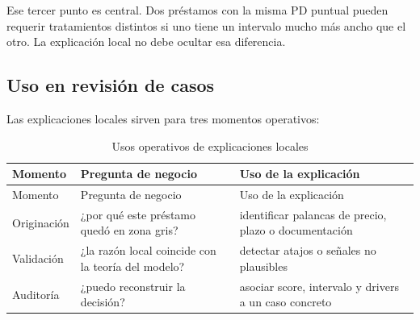 \documentclass[
  spanish,
  11pt,
  letterpaper,
]{scrbook}
\theoremstyle{plain}
\theoremstyle{remark}
\begin{document}
Ese tercer punto es central. Dos préstamos con la misma PD puntual
pueden requerir tratamientos distintos si uno tiene un intervalo mucho
más ancho que el otro. La explicación local no debe ocultar esa
diferencia.

\subsection{Uso en revisión de casos}\label{uso-en-revisiuxf3n-de-casos}

Las explicaciones locales sirven para tres momentos operativos:

\begin{longtable}[]{@{}
  >{\raggedright\arraybackslash}p{}
  >{\raggedright\arraybackslash}p{}
  >{\raggedright\arraybackslash}p{}@{}}
\caption{Usos operativos de explicaciones
locales}\label{tbl-local-uses}\tabularnewline
\toprule\noalign{}
\begin{minipage}[b]{\linewidth}\raggedright
Momento
\end{minipage} & \begin{minipage}[b]{\linewidth}\raggedright
Pregunta de negocio
\end{minipage} & \begin{minipage}[b]{\linewidth}\raggedright
Uso de la explicación
\end{minipage} \\
\midrule\noalign{}
\endfirsthead
\toprule\noalign{}
\begin{minipage}[b]{\linewidth}\raggedright
Momento
\end{minipage} & \begin{minipage}[b]{\linewidth}\raggedright
Pregunta de negocio
\end{minipage} & \begin{minipage}[b]{\linewidth}\raggedright
Uso de la explicación
\end{minipage} \\
\midrule\noalign{}
\endhead
\bottomrule\noalign{}
\endlastfoot
Originación & ¿por qué este préstamo quedó en zona gris? & identificar
palancas de precio, plazo o documentación \\
Validación & ¿la razón local coincide con la teoría del modelo? &
detectar atajos o señales no plausibles \\
Auditoría & ¿puedo reconstruir la decisión? & asociar score, intervalo y
drivers a un caso concreto \\
\end{longtable}
\end{document}
